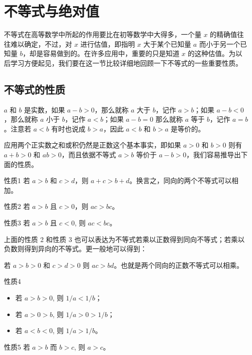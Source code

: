 \section{不等式与绝对值}
不等式在高等数学中所起的作用要比在初等数学中大得多，一个量 $x$ 的精确值往往难以确定，不过，对 $x$ 进行估值，即指明 $x$ 大于某个已知量 $a$ 而小于另一个已知量 $b$，却是容易做到的。在许多应用中，重要的只是知道 $x$ 的这种估值。为以后学习方便起见，我们要在这一节比较详细地回顾一下不等式的一些重要性质。

\subsection{不等式的性质}
$a$ 和 $b$ 是实数，如果 $a-b>0$，那么就称 $a$ 大于 $b$，记作 $a>b$；如果 $a-b<0$，那么就称 $a$ 小于 $b$，记作 $a<b$；如果 $a-b=0$ 那么就称 $a$ 等于 $b$，记作 $a=b$。注意若 $a<b$ 有时也说成 $b>a$，因此 $a<b$ 和 $b>a$ 是等价的。

应用两个正实数之和或积仍然是正数这个基本事实，即如果 $a>0$ 和 $b>0$ 则有$a+b>0$ 和 $ab>0$，而且依据不等式 $a>b$ 等价于 $a-b>0$，我们容易推导出下面的性质。

\begin{Theorem}{性质1}
  若 $a>b$ 和 $c>d$，则 $a+c>b+d$。换言之，同向的两个不等式可以相加。
\end{Theorem}

\begin{Theorem}{性质2}
  若 $a>b$ 且 $c>0$，则 $ac>bc$。
\end{Theorem}

\begin{Theorem}{性质3}
  若 $a>b$ 且 $c<0$, 则 $ac<bc$。
\end{Theorem}

上面的性质 2 和性质 3 也可以表达为不等式若乘以正数得到同向不等式；若乘以负数则得到异向的不等式。更一般地可以得到：

若 $a>b>0$ 和 $c>d>0$ 则 $ac>bd$。也就是两个同向的正数不等式可以相乘。
\begin{Theorem}{性质4}
  \begin{itemize}
    \item 若 $a>b>0$, 则 $1/a<  1/b$；
    \item 若 $a>0>b$, 则 $1/a>0>1/b$；
    \item 若 $a<b<0$, 则 $1/a>  1/b$。
  \end{itemize}
\end{Theorem}   

\begin{Theorem}{性质5}
  若 $a>b$ 而 $b>c$, 则 $a>c$。
\end{Theorem}

